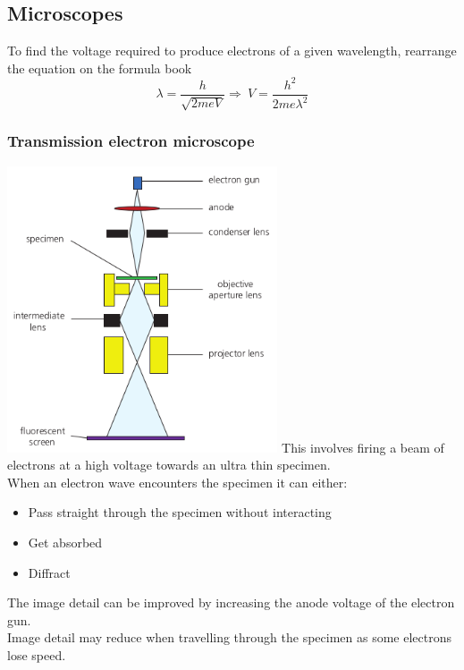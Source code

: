 \documentclass[12pt]{article}
\begin{document}
\subsection{Microscopes}
To find the voltage required to produce electrons of a given wavelength, rearrange the equation on the formula book
$$\lambda=\frac{h}{\sqrt{2meV}}\Rightarrow \ V=\frac{h^2}{2me\lambda^2}$$
\subsubsection{Transmission electron microscope}
\includegraphics[width=8cm]{tem.png}
This involves firing a beam of electrons at a high voltage towards an ultra thin specimen.\\
When an electron wave encounters the specimen it can either:
\begin{itemize}
\item Pass straight through the specimen without interacting
\item Get absorbed
\item Diffract
\end{itemize}
The image detail can be improved by increasing the anode voltage of the electron gun.\\
Image detail may reduce when travelling through the specimen as some electrons lose speed.
\end{document}
